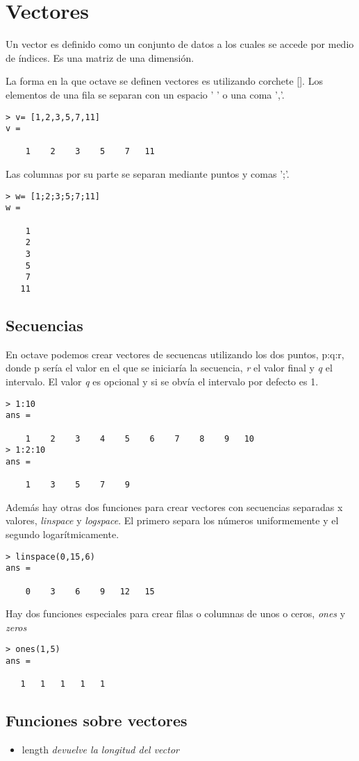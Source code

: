 \documentclass[a4,12pt]{article}
\begin{document}
\section{Vectores}
Un vector es definido como un conjunto de datos a los cuales se accede por medio de índices. Es una matriz de una dimensión.

La forma en la que octave se definen vectores es utilizando corchete []. Los elementos de una fila se separan con un espacio ' ' o una coma ','.
\begin{verbatim}
> v= [1,2,3,5,7,11]
v =

    1    2    3    5    7   11
\end{verbatim}
Las columnas por su parte se separan mediante puntos y comas ';'.
\begin{verbatim}
> w= [1;2;3;5;7;11]
w =

    1
    2
    3
    5
    7
   11
\end{verbatim}
\subsection{Secuencias}
En octave podemos crear vectores de secuencas utilizando los dos puntos, p:q:r, donde p sería el valor en el que se iniciaría la secuencia, \emph{r} el valor final y \emph{q} el intervalo. El valor \emph{q} es opcional y si se obvía el intervalo por defecto es 1.
\begin{verbatim}
> 1:10
ans =

    1    2    3    4    5    6    7    8    9   10
> 1:2:10
ans =

    1    3    5    7    9
\end{verbatim}
Además hay otras dos funciones para crear vectores con secuencias separadas x valores, \emph{linspace} y \emph{logspace}. El primero separa los números uniformemente y el segundo logarítmicamente.
\begin{verbatim}
> linspace(0,15,6)
ans =

    0    3    6    9   12   15
\end{verbatim}
Hay dos funciones especiales para crear filas o columnas de unos o ceros, \emph{ones} y \emph{zeros}
\begin{verbatim}
> ones(1,5)
ans =

   1   1   1   1   1
\end{verbatim}
\subsection{Funciones sobre vectores}
\begin{itemize}
\item length \emph{devuelve la longitud del vector}
\end{itemize}
\end{document}
